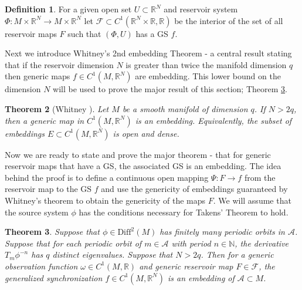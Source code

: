 \documentclass{article}
\newtheorem{theorem}{Theorem}
\theoremstyle{definition}
\newtheorem{defn}[theorem]{Definition}
\theoremstyle{definition}
\numberwithin{theorem}{section}
\begin{document}
\begin{defn}
    For a given open set $U \subset \mathbb{R}^N$ and reservoir system $\Phi : M \times \mathbb{R}^N \to M \times \mathbb{R}^N$ let $\mathcal{F} \subset C^1(\mathbb{R}^N \times \mathbb{R}, \mathbb{R})$ be the interior of the set of all reservoir maps $F$ such that $(\Phi,U)$ has a GS $f$.
\end{defn}

Next we introduce Whitney's 2nd embedding Theorem - a central result stating that if the reservoir dimension $N$ is greater than twice the manifold dimension $q$ then generic maps $f \in C^1(M,\mathbb{R}^N)$ are embedding. This lower bound on the dimension $N$ will be used to prove the major result of this section; Theorem \ref{thm::generic_F_embedding_f}.

\begin{theorem}[Whitney \cite{Whitney1936,Lee2013}]
    Let $M$ be a smooth manifold of dimension $q$. 
    If $N > 2q$, then a generic map in $C^1(M,\mathbb{R}^N)$ is an embedding. 
    Equivalently, the subset of embeddings $E \subset C^1(M,\mathbb{R}^N)$ is open and dense.
\end{theorem}

Now we are ready to state and prove the major theorem - that for generic reservoir maps that have a GS, the associated GS is an embedding. The idea behind the proof is to define a continuous open mapping $\Psi : F \to f$ from the reservoir map to the GS $f$ and use the genericity of embeddings guaranteed by Whitney's theorem to obtain the genericity of the maps $F$. We will assume that the source system $\phi$ has the conditions necessary for Takens' Theorem to hold.

\begin{theorem} 
\label{thm::generic_F_embedding_f}
Suppose that $\phi \in \mathrm{Diff}^2(M)$ has finitely many periodic orbits in $\mathcal{A}$. Suppose that for each periodic orbit of $m \in \mathcal{A}$ with period $n \in \mathbb{N}$, the derivative $T_m \phi^{-n}$ has $q$ distinct eigenvalues. Suppose that $N > 2q$. Then for a generic observation function $\omega \in C^1(M,\mathbb{R})$ and generic reservoir map $F \in \mathcal{F}$, the generalized synchronization
\(
f \in C^1(M,\mathbb{R}^N)
\)
is an embedding of $\mathcal{A} \subset M$.
\end{theorem}
\end{document}

